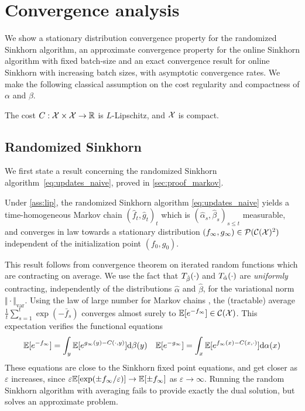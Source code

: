 

\section{Convergence analysis}\label{sec:analysis}

We show a
stationary distribution convergence property for the randomized Sinkhorn algorithm,
 an approximate convergence property for the online Sinkhorn algorithm with
fixed batch-size and an exact convergence result for online Sinkhorn with
increasing batch sizes, with asymptotic convergence rates. We make the following classical assumption on the cost regularity and compactness of $\alpha$ and $\beta$.

\begin{assumption}\label{ass:lip}
    The cost $C: \mathcal{X} \times \mathcal{X} \to \mathbb{R}$ is $L$-Lipschitz, and $\mathcal{X}$ is  compact.
\end{assumption}

\subsection{Randomized Sinkhorn}

We first state a result concerning the randomized Sinkhorn algorithm~\eqref{eq:updates_naive}, proved in \autoref{sec:proof_markov}.

\begin{proposition}\label{prop:markov}
    Under \autoref{ass:lip}, the randomized Sinkhorn algorithm \eqref{eq:updates_naive} yields a time-homogeneous
    Markov chain ${(\hat f_t, \hat g_t)}_t$ which is $(\hat \alpha_s, \hat \beta_s)_{s \leq
    t}$ measurable, and converges in law towards a stationary distribution
    $(f_\infty, g_\infty) \in \mathcal{P}(\mathcal{C}(\mathcal{X})^2)$ independent of the initialization
    point $(f_0, g_0)$.
\end{proposition}

This result follows from \citet{diaconis_iterated} convergence theorem on
iterated random functions which are contracting on average. We use the
fact that $T_{\hat \beta}(\cdot)$ and $T_{\hat \alpha}(\cdot)$ are
\textit{uniformly} contracting, independently of the distributions $\hat \alpha$ and
$\hat \beta$, for the variational norm $\Vert \cdot \Vert_{\text{var}}$.
Using the law of large number for Markov chains
\citep{breiman_strong_1960}, the (tractable) average $\frac{1}{t} \sum_{s=1}^t \exp(-\bar f_s)$
converges almost surely to $\mathbb{E}[e^{-f_\infty}]
 \in \mathcal{C}(\mathcal{X})$. This expectation verifies the functional equations
\begin{equation}
    \mathbb{E}[e^{-f_\infty}] =
     \int_{y} \mathbb{E}[e^{g_\infty(y) -C(\cdot, y)}]\textrm{d} \beta(y) 
     \quad
    \mathbb{E}[e^{-g_\infty}] =
    \int_{x} \mathbb{E}[e^{f_\infty(x) -C(x, \cdot)}]\textrm{d} \alpha(x) 
\end{equation}
These equations are close to the Sinkhorn fixed point equations, and
get closer as $\varepsilon$ increases, since $\varepsilon \mathbb{E}[\exp(\pm f_\infty /
\varepsilon)] \to \mathbb{E}[\pm f_\infty]$ as $\varepsilon \to \infty$. Running the random
Sinkhorn algorithm with averaging fails to provide exactly the dual solution, but solves an approximate problem.
%

